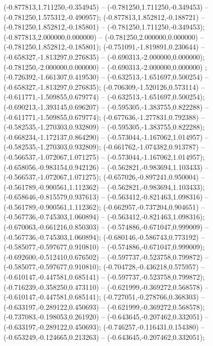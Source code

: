  (-0.877813,1.711250,-0.354945) -- (-0.781250,1.711250,-0.349453) -- (-0.781250,1.575312,-0.490957);
 (-0.877813,1.852812,-0.188721) -- (-0.781250,1.852812,-0.185801) -- (-0.781250,1.711250,-0.349453);
 (-0.877813,2.000000,0.000000) -- (-0.781250,2.000000,0.000000) -- (-0.781250,1.852812,-0.185801);
 (-0.751091,-1.819891,0.230644) -- (-0.658327,-1.813297,0.276835) -- (-0.690313,-2.000000,0.000000);
 (-0.781250,-2.000000,0.000000) -- (-0.690313,-2.000000,0.000000) ;
 (-0.726392,-1.661307,0.419530) -- (-0.632513,-1.651697,0.500254) -- (-0.658327,-1.813297,0.276835);
 (-0.706309,-1.520126,0.573114) -- (-0.611771,-1.509855,0.679774) -- (-0.632513,-1.651697,0.500254);
 (-0.690213,-1.393145,0.696207) -- (-0.595305,-1.383755,0.822288) -- (-0.611771,-1.509855,0.679774);
 (-0.677636,-1.277831,0.792388) -- (-0.582535,-1.270303,0.932809) -- (-0.595305,-1.383755,0.822288);
 (-0.668234,-1.172137,0.864290) -- (-0.573044,-1.167062,1.014957) -- (-0.582535,-1.270303,0.932809);
 (-0.661762,-1.074382,0.913787) -- (-0.566537,-1.072067,1.071275) -- (-0.573044,-1.167062,1.014957);
 (-0.658056,-0.983154,0.942126) -- (-0.562821,-0.983694,1.103433) -- (-0.566537,-1.072067,1.071275);
 (-0.657026,-0.897241,0.950004) -- (-0.561789,-0.900561,1.112362) -- (-0.562821,-0.983694,1.103433);
 (-0.658646,-0.815579,0.937613) -- (-0.563412,-0.821463,1.098316) -- (-0.561789,-0.900561,1.112362);
 (-0.662957,-0.737204,0.904651) -- (-0.567736,-0.745303,1.060894) -- (-0.563412,-0.821463,1.098316);
 (-0.670063,-0.661216,0.850303) -- (-0.574886,-0.671047,0.999009) -- (-0.567736,-0.745303,1.060894);
 (-0.680146,-0.586743,0.773192) -- (-0.585077,-0.597677,0.910810) -- (-0.574886,-0.671047,0.999009);
 (-0.692600,-0.512410,0.676502) -- (-0.597737,-0.523758,0.799872) -- (-0.585077,-0.597677,0.910810);
 (-0.704728,-0.436218,0.575957) -- (-0.610147,-0.447581,0.685141) -- (-0.597737,-0.523758,0.799872);
 (-0.716239,-0.358250,0.473110) -- (-0.621999,-0.369272,0.568578) -- (-0.610147,-0.447581,0.685141);
 (-0.727051,-0.278766,0.368303) -- (-0.633197,-0.289122,0.450693) -- (-0.621999,-0.369272,0.568578);
 (-0.737083,-0.198053,0.261920) -- (-0.643645,-0.207462,0.332051) -- (-0.633197,-0.289122,0.450693);
 (-0.746257,-0.116431,0.154380) -- (-0.653249,-0.124665,0.213263) -- (-0.643645,-0.207462,0.332051);
